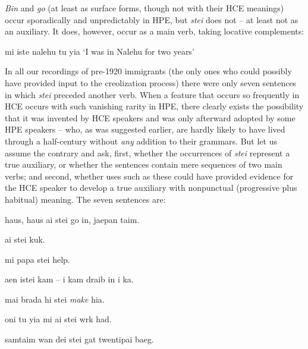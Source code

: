 \textit{Bin} and \textit{go} (at least as surface forms, though not with their HCE meanings) occur sporadically and unpredictably in HPE, but \textit{stei} does not -- at least not as an auxiliary. It does, however, occur as a main verb, taking locative complements:

\ea\label{ex:44}
 mi iste nalehu tu yia
\glt `I was in Nalehu for two years'
\z

\noindent In all our recordings of pre-1920 immigrants (the only ones who could possibly have provided input to the creolization process) there were only seven sentences in which \textit{stei} preceded another verb. When a feature that occurs so frequently in HCE occurs with such vanishing rarity in HPE, there clearly exists the possibility that it was invented by HCE speakers and was only afterward adopted by some HPE speakers -- who, as was suggested earlier, are hardly likely to have lived through a half-century without \textit{any} addition to their grammars. But let us assume the contrary and ask, first, whether the occurrences of \textit{stei} represent 
% 
a true auxiliary, or whether the sentences contain mere sequences of two main verbs; and second, whether uses such as these could have provided evidence for the HCE speaker to develop a true auxiliary with nonpunctual (progressive plus habitual) meaning. The seven sentences are:

\ea\label{ex:45}
 haus, haus ai stei go in, jaepan taim.
\z

\ea\label{ex:46}
 ai stei kuk.
\z

\ea\label{ex:47}
 mi papa stei help.
\z

\ea\label{ex:48}
 aen istei kam -- i kam draib in i ka.
\z

\ea\label{ex:49}
 mai brada hi stei \textit{make} hia.
\z

\ea\label{ex:50}
oni tu yia mi ai stei wrk had.
\z

\ea\label{ex:51}
samtaim wan dei stei gat twentipai baeg.
\z


